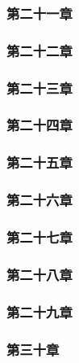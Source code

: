\subsubsection{第二十一章}



\subsubsection{第二十二章}



\subsubsection{第二十三章}



\subsubsection{第二十四章}



\subsubsection{第二十五章}



\subsubsection{第二十六章}



\subsubsection{第二十七章}



\subsubsection{第二十八章}



\subsubsection{第二十九章}



\subsubsection{第三十章}



